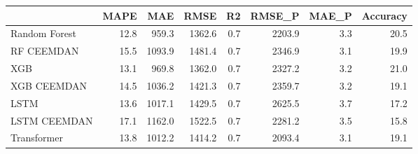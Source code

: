 \begin{tabular}{lrrrrrrr}
\toprule
{} &  MAPE &    MAE &   RMSE &  R2 &  RMSE\_P &  MAE\_P &  Accuracy \\
\midrule
Random Forest &  12.8 &  959.3 & 1362.6 & 0.7 &  2203.9 &    3.3 &      20.5 \\
RF CEEMDAN    &  15.5 & 1093.9 & 1481.4 & 0.7 &  2346.9 &    3.1 &      19.9 \\
XGB           &  13.1 &  969.8 & 1362.0 & 0.7 &  2327.2 &    3.2 &      21.0 \\
XGB CEEMDAN   &  14.5 & 1036.2 & 1421.3 & 0.7 &  2359.7 &    3.2 &      19.1 \\
LSTM          &  13.6 & 1017.1 & 1429.5 & 0.7 &  2625.5 &    3.7 &      17.2 \\
LSTM CEEMDAN  &  17.1 & 1162.0 & 1522.5 & 0.7 &  2281.2 &    3.5 &      15.8 \\
Transformer   &  13.8 & 1012.2 & 1414.2 & 0.7 &  2093.4 &    3.1 &      19.1 \\
\bottomrule
\end{tabular}
